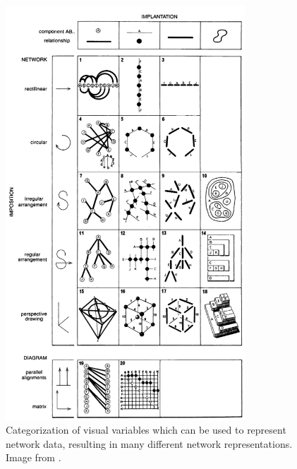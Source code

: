 \begin{figure}
    \centering %
    \includegraphics[width=0.8\textwidth]{static/figures/RelatedWork/BertinNetworks}
    \caption{Categorization of visual variables which can be used to represent network data, resulting in many different network representations. Image from \cite{bertin1967}.}
    \label{fig:bertin-network}
\end{figure}


